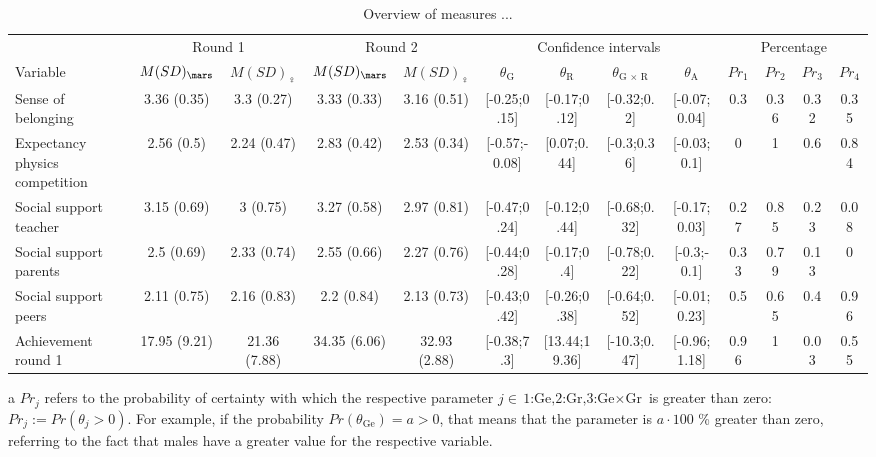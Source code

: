 \documentclass[C:/Users/sunpn505/Documents/studies/WinnerS/Erhebungen/IPhO1718/paper/problem_solving/main/main]{subfiles}
\begin{document}
\begin{sidewaystable}
\begin{adjustwidth}{-4.5cm}{-1cm}
\caption{Overview of measures ...}
\label{InitialDifferences}
\begin{threeparttable}
\begin{tabular}{lcccccccccccc}
\toprule
& \multicolumn{2}{c}{Round 1} & \multicolumn{2}{c}{Round 2} & \multicolumn{4}{c}{Confidence intervals} & \multicolumn{4}{c}{Percentage} \\
  \cmidrule(lr){2-3} \cmidrule(lr){4-5} \cmidrule(lr){6-9} \cmidrule(lr){10-13}  
Variable & $M(SD)_{\mars}$ & $M(SD)_{\female}$ & $M(SD)_{\mars}$ & $M(SD)_{\female}$ & $\theta_{\text{G}}$ & $\theta_{\text{R}}$ & $\theta_{\text{G $\times$ R}}$ & $\theta_{\text{A}}$ & $Pr_1$\tnote{a} & $Pr_2$ & $Pr_3$ & $Pr_4$ \\ 
  \midrule
Sense of belonging & 3.36 (0.35) & 3.3 (0.27) & 3.33 (0.33) & 3.16 (0.51) & [-0.25;0.15] & [-0.17;0.12] & [-0.32;0.2] & [-0.07;0.04] & 0.3 & 0.36 & 0.32 & 0.35 \\ 
  Expectancy physics competition & 2.56 (0.5) & 2.24 (0.47) & 2.83 (0.42) & 2.53 (0.34) & [-0.57;-0.08] & [0.07;0.44] & [-0.3;0.36] & [-0.03;0.1] & 0 & 1 & 0.6 & 0.84 \\ 
  Social support teacher & 3.15 (0.69) & 3 (0.75) & 3.27 (0.58) & 2.97 (0.81) & [-0.47;0.24] & [-0.12;0.44] & [-0.68;0.32] & [-0.17;0.03] & 0.27 & 0.85 & 0.23 & 0.08 \\ 
  Social support parents & 2.5 (0.69) & 2.33 (0.74) & 2.55 (0.66) & 2.27 (0.76) & [-0.44;0.28] & [-0.17;0.4] & [-0.78;0.22] & [-0.3;-0.1] & 0.33 & 0.79 & 0.13 & 0 \\ 
  Social support peers & 2.11 (0.75) & 2.16 (0.83) & 2.2 (0.84) & 2.13 (0.73) & [-0.43;0.42] & [-0.26;0.38] & [-0.64;0.52] & [-0.01;0.23] & 0.5 & 0.65 & 0.4 & 0.96 \\ 
  Achievement round 1 & 17.95 (9.21) & 21.36 (7.88) & 34.35 (6.06) & 32.93 (2.88) & [-0.38;7.3] & [13.44;19.36] & [-10.3;0.47] & [-0.96;1.18] & 0.96 & 1 & 0.03 & 0.55 \\ 
   \bottomrule\end{tabular}
\begin{tablenotes}
  \item[a] $Pr_j$ refers to the probability of certainty with which the respective parameter $j\in{\text{1:Ge,2:Gr,3:Ge$\times$Gr}}$ is greater than zero: $Pr_j:= Pr(\theta_{j}>0)$. For example, if the probability $Pr(\theta_{\text{Ge}})=a>0$, that means that the parameter is $a\cdot 100$ \% greater than zero, referring to the fact that males have a greater value for the respective variable.
\end{tablenotes}
\end{threeparttable}
\end{adjustwidth}
\end{sidewaystable}
\end{document}
